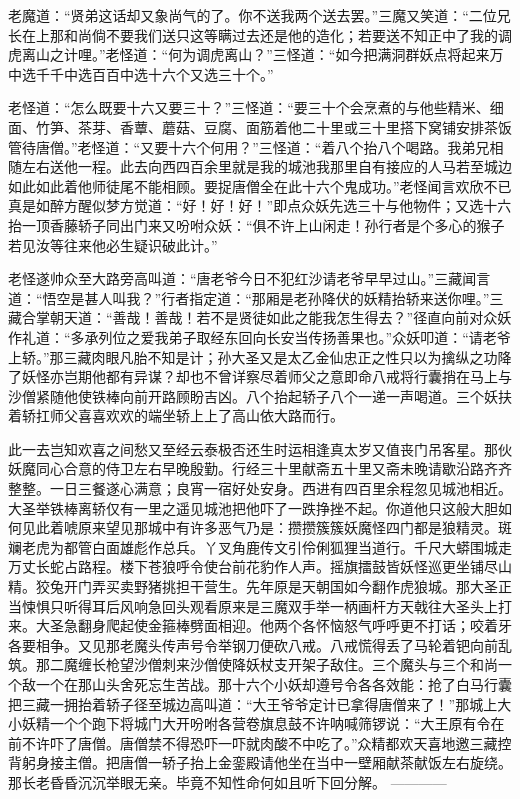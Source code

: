 \documentclass[12pt,UTF8]{ctexbook}
\begin{document}
{	老魔道：“贤弟这话却又象尚气的了。你不送我两个送去罢。”三魔又笑道：“二位兄长在上那和尚倘不要我们送只这等瞒过去还是他的造化；若要送不知正中了我的调虎离山之计哩。”老怪道：“何为调虎离山？”三怪道：“如今把满洞群妖点将起来万中选千千中选百百中选十六个又选三十个。”
	
	老怪道：“怎么既要十六又要三十？”三怪道：“要三十个会烹煮的与他些精米、细面、竹笋、茶芽、香蕈、蘑菇、豆腐、面筋着他二十里或三十里搭下窝铺安排茶饭管待唐僧。”老怪道：“又要十六个何用？”三怪道：“着八个抬八个喝路。我弟兄相随左右送他一程。此去向西四百余里就是我的城池我那里自有接应的人马若至城边如此如此着他师徒尾不能相顾。要捉唐僧全在此十六个鬼成功。”老怪闻言欢欣不已真是如醉方醒似梦方觉道：“好！好！好！”即点众妖先选三十与他物件；又选十六抬一顶香藤轿子同出门来又吩咐众妖：“俱不许上山闲走！孙行者是个多心的猴子若见汝等往来他必生疑识破此计。”
	
	老怪遂帅众至大路旁高叫道：“唐老爷今日不犯红沙请老爷早早过山。”三藏闻言道：“悟空是甚人叫我？”行者指定道：“那厢是老孙降伏的妖精抬轿来送你哩。”三藏合掌朝天道：“善哉！善哉！若不是贤徒如此之能我怎生得去？”径直向前对众妖作礼道：“多承列位之爱我弟子取经东回向长安当传扬善果也。”众妖叩道：“请老爷上轿。”那三藏肉眼凡胎不知是计；孙大圣又是太乙金仙忠正之性只以为擒纵之功降了妖怪亦岂期他都有异谋？却也不曾详察尽着师父之意即命八戒将行囊捎在马上与沙僧紧随他使铁棒向前开路顾盼吉凶。八个抬起轿子八个一递一声喝道。三个妖扶着轿扛师父喜喜欢欢的端坐轿上上了高山依大路而行。
	
	此一去岂知欢喜之间愁又至经云泰极否还生时运相逢真太岁又值丧门吊客星。那伙妖魔同心合意的侍卫左右早晚殷勤。行经三十里献斋五十里又斋未晚请歇沿路齐齐整整。一日三餐遂心满意；良宵一宿好处安身。西进有四百里余程忽见城池相近。大圣举铁棒离轿仅有一里之遥见城池把他吓了一跌挣挫不起。你道他只这般大胆如何见此着唬原来望见那城中有许多恶气乃是：攒攒簇簇妖魔怪四门都是狼精灵。斑斓老虎为都管白面雄彪作总兵。丫叉角鹿传文引伶俐狐狸当道行。千尺大蟒围城走万丈长蛇占路程。楼下苍狼呼令使台前花豹作人声。摇旗擂鼓皆妖怪巡更坐铺尽山精。狡兔开门弄买卖野猪挑担干营生。先年原是天朝国如今翻作虎狼城。那大圣正当悚惧只听得耳后风响急回头观看原来是三魔双手举一柄画杆方天戟往大圣头上打来。大圣急翻身爬起使金箍棒劈面相迎。他两个各怀恼怒气呼呼更不打话；咬着牙各要相争。又见那老魔头传声号令举钢刀便砍八戒。八戒慌得丢了马轮着钯向前乱筑。那二魔缠长枪望沙僧刺来沙僧使降妖杖支开架子敌住。三个魔头与三个和尚一个敌一个在那山头舍死忘生苦战。那十六个小妖却遵号令各各效能：抢了白马行囊把三藏一拥抬着轿子径至城边高叫道：“大王爷爷定计已拿得唐僧来了！”那城上大小妖精一个个跑下将城门大开吩咐各营卷旗息鼓不许呐喊筛锣说：“大王原有令在前不许吓了唐僧。唐僧禁不得恐吓一吓就肉酸不中吃了。”众精都欢天喜地邀三藏控背躬身接主僧。把唐僧一轿子抬上金銮殿请他坐在当中一壁厢献茶献饭左右旋绕。那长老昏昏沉沉举眼无亲。毕竟不知性命何如且听下回分解。
	------------
	
}
\end{document}
